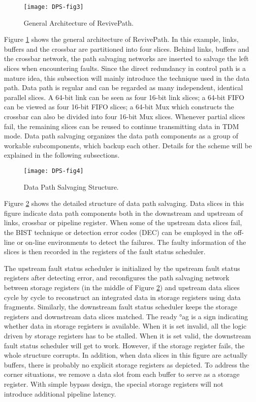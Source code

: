 \begin{figure}[h]
      \centering
        \texttt{[image: DPS-fig3]}
        \caption{General Architecture of RevivePath.}
        \label{fig:dps-fig3}
\end{figure}


Figure \ref{fig:dps-fig3} shows the general architecture of RevivePath. In this example, links, buffers and the crossbar are partitioned into four slices. Behind links, buffers and the crossbar network, the path salvaging networks are inserted to salvage the left slices when encountering faults. Since the direct redundancy in control path is a mature idea, this subsection will mainly introduce the technique used in the data path. Data path is regular and can be regarded as many independent, identical parallel slices. A 64-bit link can be seen as four 16-bit link slices; a 64-bit FIFO can be viewed as four 16-bit FIFO slices; a 64-bit Mux which constructs the crossbar can also be divided into four 16-bit Mux slices. Whenever partial slices fail, the remaining slices can be reused to continue transmitting data in TDM mode. Data path salvaging organizes the data path components as a group of workable subcomponents, which backup each other. Details for the scheme will be explained in the following subsections.

\begin{figure}[h]
      \centering
        \texttt{[image: DPS-fig4]}
        \caption{Data Path Salvaging Structure.}
        \label{fig:dps-fig4}
\end{figure}


Figure \ref{fig:dps-fig4} shows the detailed structure of data path salvaging. Data slices in this figure indicate data path components both in the downstream and upstream of links, crossbar or pipeline register. When some of the upstream data slices fail, the BIST technique \cite{fick2009highly} \cite{alaghi2007online} or detection error codes (DEC) can be employed in the off-line or on-line environments to detect the failures. The faulty information of the slices is then recorded in the registers of the fault status scheduler.

The upstream fault status scheduler is initialized by the upstream fault status registers after detecting error, and reconfigures the path salvaging network between storage registers (in the middle of Figure \ref{fig:dps-fig4}) and upstream data slices cycle by cycle to reconstruct an integrated data in storage registers using data fragments. Similarly, the downstream fault status scheduler keeps the storage registers and downstream data slices matched. The ready °ag is a sign indicating whether data in storage registers is available. When it is set invalid, all the logic driven by storage registers has to be stalled. When it is set valid, the downstream fault status scheduler will get to work. However, if the storage register fails, the whole structure corrupts. In addition, when data slices in this figure are actually buffers, there is probably no explicit storage registers as depicted. To address the corner situations, we remove a data slot from each buffer to serve as a storage register. With simple bypass design, the special storage registers will not introduce additional pipeline latency. 


